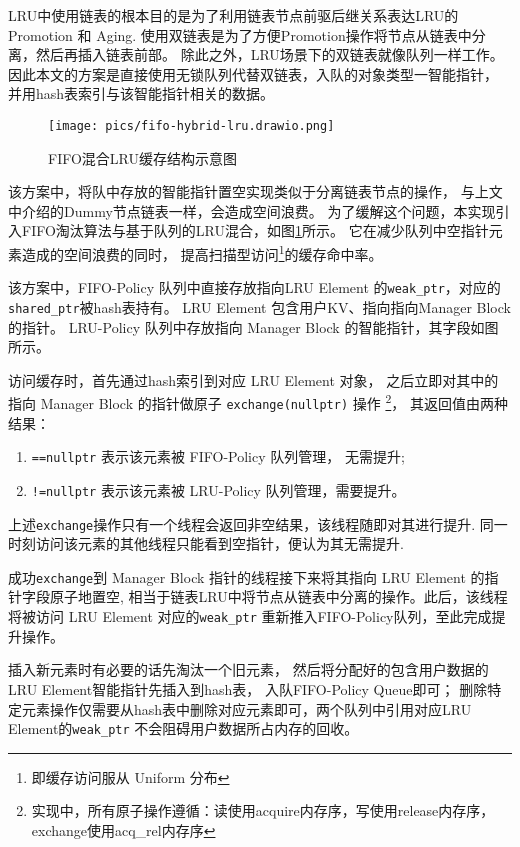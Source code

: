 LRU中使用链表的根本目的是为了利用链表节点前驱后继关系表达LRU的 Promotion 和 Aging.
使用双链表是为了方便Promotion操作将节点从链表中分离，然后再插入链表前部。
除此之外，LRU场景下的双链表就像队列一样工作。
因此本文的方案是直接使用无锁队列代替双链表，入队的对象类型一智能指针，
并用hash表索引与该智能指针相关的数据。

\begin{figure}
    \centering
    \texttt{[image: pics/fifo-hybrid-lru.drawio.png]}
    \caption{FIFO混合LRU缓存结构示意图}
    \label{fig:fifo-h}
\end{figure}

该方案中，将队中存放的智能指针置空实现类似于分离链表节点的操作，
与上文中介绍的Dummy节点链表一样，会造成空间浪费。
为了缓解这个问题，本实现引入FIFO淘汰算法与基于队列的LRU混合，如图\ref{fig:fifo-h}所示。
它在减少队列中空指针元素造成的空间浪费的同时，
提高扫描型访问\footnote{即缓存访问服从 Uniform 分布}的缓存命中率。

该方案中，FIFO-Policy 队列中直接存放指向LRU Element 的\verb|weak_ptr|，对应的\verb|shared_ptr|被hash表持有。
LRU Element 包含用户KV、指向指向Manager Block 的指针。
LRU-Policy 队列中存放指向 Manager Block 的智能指针，其字段如图所示。

访问缓存时，首先通过hash索引到对应 LRU Element 对象，
之后立即对其中的指向 Manager Block 的指针做原子 \verb|exchange(nullptr)| 操作
\footnote{实现中，所有原子操作遵循：读使用acquire内存序，写使用release内存序，exchange使用acq\_rel内存序}，
其返回值由两种结果：
\begin{enumerate}
    \item \verb|==nullptr| 表示该元素被 FIFO-Policy 队列管理， 无需提升;
    \item \verb|!=nullptr| 表示该元素被 LRU-Policy 队列管理，需要提升。
\end{enumerate}
上述\verb|exchange|操作只有一个线程会返回非空结果，该线程随即对其进行提升.
同一时刻访问该元素的其他线程只能看到空指针，便认为其无需提升.

成功\verb|exchange|到 Manager Block 指针的线程接下来将其指向 LRU Element 的指针字段原子地置空,
相当于链表LRU中将节点从链表中分离的操作。此后，该线程将被访问 LRU Element 对应的\verb|weak_ptr|
重新推入FIFO-Policy队列，至此完成提升操作。

插入新元素时有必要的话先淘汰一个旧元素，
然后将分配好的包含用户数据的LRU Element智能指针先插入到hash表，
入队FIFO-Policy Queue即可；
删除特定元素操作仅需要从hash表中删除对应元素即可，两个队列中引用对应LRU Element的\verb|weak_ptr|
不会阻碍用户数据所占内存的回收。

